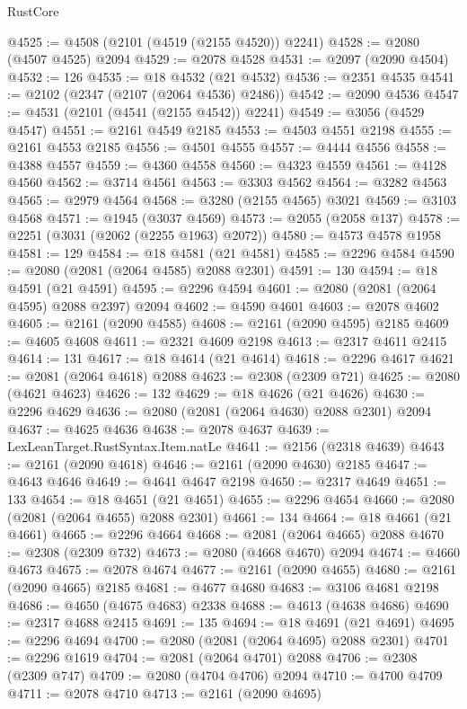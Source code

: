 \begin{lexlean}{RustCore}
\begin{coremodule}
@4525 := @4508 (@2101 (@4519 (@2155 @4520)) @2241)
@4528 := @2080 (@4507 @4525) @2094
@4529 := @2078 @4528
@4531 := @2097 (@2090 @4504)
@4532 := 126
@4535 := @18 @4532 (@21 @4532)
@4536 := @2351 @4535
@4541 := @2102 (@2347 (@2107 (@2064 @4536) @2486))
@4542 := @2090 @4536
@4547 := @4531 (@2101 (@4541 (@2155 @4542)) @2241)
@4549 := @3056 (@4529 @4547)
@4551 := @2161 @4549 @2185
@4553 := @4503 @4551 @2198
@4555 := @2161 @4553 @2185
@4556 := @4501 @4555
@4557 := @4444 @4556
@4558 := @4388 @4557
@4559 := @4360 @4558
@4560 := @4323 @4559
@4561 := @4128 @4560
@4562 := @3714 @4561
@4563 := @3303 @4562
@4564 := @3282 @4563
@4565 := @2979 @4564
@4568 := @3280 (@2155 @4565) @3021
@4569 := @3103 @4568
@4571 := @1945 (@3037 @4569)
@4573 := @2055 (@2058 @137)
@4578 := @2251 (@3031 (@2062 (@2255 @1963) @2072))
@4580 := @4573 @4578 @1958
@4581 := 129
@4584 := @18 @4581 (@21 @4581)
@4585 := @2296 @4584
@4590 := @2080 (@2081 (@2064 @4585) @2088 @2301)
@4591 := 130
@4594 := @18 @4591 (@21 @4591)
@4595 := @2296 @4594
@4601 := @2080 (@2081 (@2064 @4595) @2088 @2397) @2094
@4602 := @4590 @4601
@4603 := @2078 @4602
@4605 := @2161 (@2090 @4585)
@4608 := @2161 (@2090 @4595) @2185
@4609 := @4605 @4608
@4611 := @2321 @4609 @2198
@4613 := @2317 @4611 @2415
@4614 := 131
@4617 := @18 @4614 (@21 @4614)
@4618 := @2296 @4617
@4621 := @2081 (@2064 @4618) @2088
@4623 := @2308 (@2309 @721)
@4625 := @2080 (@4621 @4623)
@4626 := 132
@4629 := @18 @4626 (@21 @4626)
@4630 := @2296 @4629
@4636 := @2080 (@2081 (@2064 @4630) @2088 @2301) @2094
@4637 := @4625 @4636
@4638 := @2078 @4637
@4639 := LexLeanTarget.RustSyntax.Item.natLe
@4641 := @2156 (@2318 @4639)
@4643 := @2161 (@2090 @4618)
@4646 := @2161 (@2090 @4630) @2185
@4647 := @4643 @4646
@4649 := @4641 @4647 @2198
@4650 := @2317 @4649
@4651 := 133
@4654 := @18 @4651 (@21 @4651)
@4655 := @2296 @4654
@4660 := @2080 (@2081 (@2064 @4655) @2088 @2301)
@4661 := 134
@4664 := @18 @4661 (@21 @4661)
@4665 := @2296 @4664
@4668 := @2081 (@2064 @4665) @2088
@4670 := @2308 (@2309 @732)
@4673 := @2080 (@4668 @4670) @2094
@4674 := @4660 @4673
@4675 := @2078 @4674
@4677 := @2161 (@2090 @4655)
@4680 := @2161 (@2090 @4665) @2185
@4681 := @4677 @4680
@4683 := @3106 @4681 @2198
@4686 := @4650 (@4675 @4683) @2338
@4688 := @4613 (@4638 @4686)
@4690 := @2317 @4688 @2415
@4691 := 135
@4694 := @18 @4691 (@21 @4691)
@4695 := @2296 @4694
@4700 := @2080 (@2081 (@2064 @4695) @2088 @2301)
@4701 := @2296 @1619
@4704 := @2081 (@2064 @4701) @2088
@4706 := @2308 (@2309 @747)
@4709 := @2080 (@4704 @4706) @2094
@4710 := @4700 @4709
@4711 := @2078 @4710
@4713 := @2161 (@2090 @4695)

\end{coremodule}
\end{lexlean}
